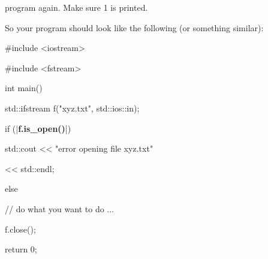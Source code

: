 program again. Make sure 1 is printed.



So your program should look like the following (or something similar):



\begin{consolethree}[escapeinside=||]

#include <iostream>

#include <fstream>



int main()

{   

    std::ifstream f("xyz.txt", std::ios::in);

    if (|\textbf{f.is\_open()}|)

    {    

         std::cout << "error opening file xyz.txt"

                   << std::endl;

    }

    else

    {   

         // do what you want to do ...

         f.close();

    }

    

    return 0;

}

\end{consolethree}

